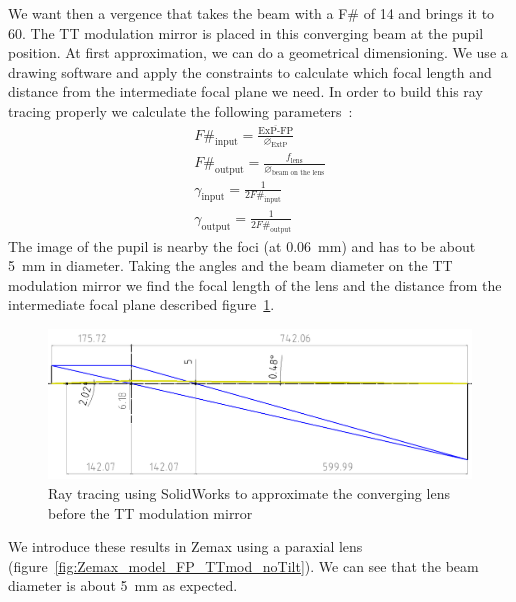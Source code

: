\documentclass[12pt,a4paper]{article}
\begin{document}
We want then a vergence that takes the beam with a F\# of 14 and brings it to 60. The TT modulation mirror is placed in this converging beam at the pupil position. At first approximation, we can do a geometrical dimensioning. We use a drawing software and apply the constraints to calculate which focal length and distance from the intermediate focal plane we need. In order to build this ray tracing properly we calculate the following parameters~:
\begin{eqnarray}
	F\#_\text{input} = \frac{\overline{\text{ExP-FP}}}{\diameter_{\text{ExtP}}}\nonumber\\
	F\#_\text{output} = \frac{f_\text{lens}}{\diameter_\text{beam on the lens}}\nonumber\\
	\gamma_\text{input} = \frac{1}{2F\#_\text{input}}\nonumber\\
	\gamma_\text{output} = \frac{1}{2F\#_\text{output}}\nonumber
\end{eqnarray}
The image of the pupil is nearby the foci (at 0.06~mm) and has to be about 5~mm in diameter. Taking the angles and the beam diameter on the TT modulation mirror we find the focal length of the lens and the distance from the intermediate focal plane described figure~\ref{fig:SW_trace_rayons_lens_TTMM}.
\begin{figure}[H]
	\begin{center}
		\includegraphics[width=.9\textwidth]{images/SW_trace_rayons_lens_TTMM.PNG}
		\caption{Ray tracing using SolidWorks to approximate the converging lens before the TT modulation mirror}\label{fig:SW_trace_rayons_lens_TTMM}
	\end{center}
\end{figure}
We introduce these results in Zemax using a paraxial lens (figure~\ref{fig:Zemax_model_FP_TTmod_noTilt}). We can see that the beam diameter is about 5~mm as expected.
\end{document}

